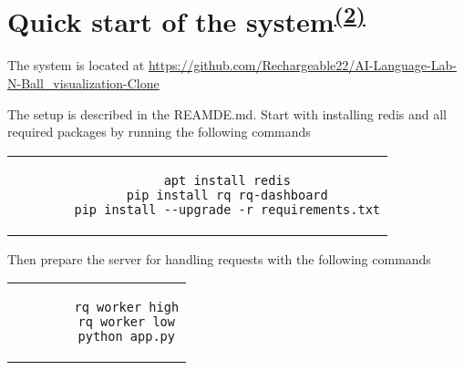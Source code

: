 \appendix
\chapter{Quick start of the system\textsuperscript{\hyperref[Oliver]{(2)}}}

The system is located at
\url{https://github.com/Rechargeable22/AI-Language-Lab-N-Ball_visualization-Clone}

The setup is described in the REAMDE.md.
Start with installing redis and all required packages by running the following commands

\begin{center}
	\begin{tabular}{c}
		\begin{lstlisting}
		apt install redis
		pip install rq rq-dashboard
		pip install --upgrade -r requirements.txt
		\end{lstlisting}
	\end{tabular}
\end{center}

Then prepare the server for handling requests with the following commands

\begin{center}
	\begin{tabular}{c}
		\begin{lstlisting}
		rq worker high
		rq worker low
		python app.py
		\end{lstlisting}
	\end{tabular}
\end{center}